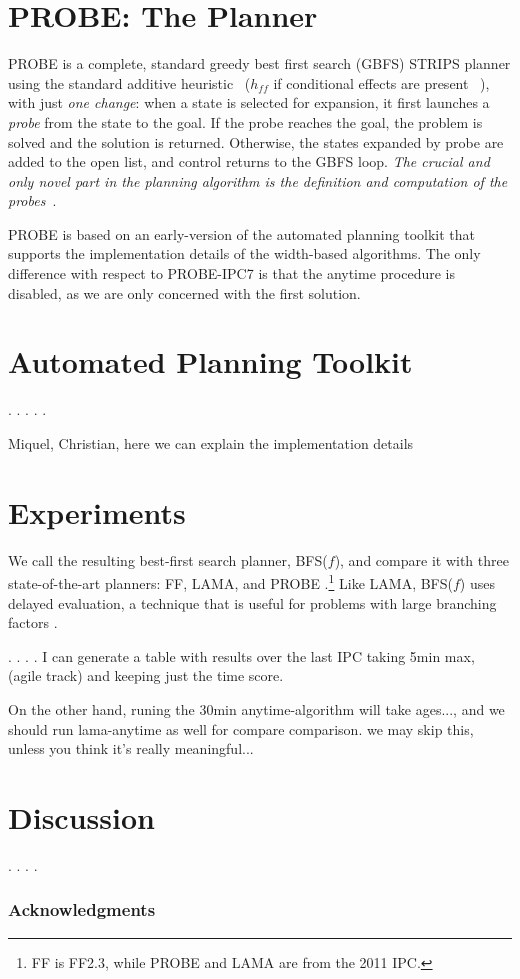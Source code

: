 \documentclass[letterpaper]{article}
\begin{document}
\section{PROBE: The Planner}

PROBE is a complete, standard greedy best first search (GBFS) STRIPS
planner using the standard {additive heuristic}~\cite{bonet:aij-hsp}
($h_{ff}$ if conditional effects are present ~\cite{hoffmann:ff}),
with just \emph{one change}: when a state is selected for expansion,
it first launches a \emph{probe} from the state to the goal. If the
probe reaches the goal, the problem is solved and the solution is
returned. Otherwise, the states expanded by probe are added to the
open list, and control returns to the GBFS loop.  \emph{The crucial
  and only novel part in the planning algorithm is the definition and
  computation of the probes}~\cite{nir:icaps11}.

PROBE is based on an early-version of the automated planning toolkit
that supports the implementation details of the width-based
algorithms. The only difference with respect to PROBE-IPC7 is that the
anytime procedure is disabled, as we are only concerned with the first
solution.

\section{Automated Planning Toolkit}
.
.
.
.
.

Miquel, Christian, here we can explain the implementation details


\section{Experiments}

We call the resulting best-first search planner, BFS($f$), and compare
it with three state-of-the-art planners: FF, LAMA, and PROBE
\cite{hoffmann:ff,richter:lama,nir:icaps11}.\footnote{FF is FF2.3,
  while PROBE and LAMA are from the 2011 IPC.}  Like LAMA, BFS($f$)
uses delayed evaluation, a technique that is useful for problems with
large branching factors \cite{richter:preferred-ops-and-deferred}.

.  .  .  .  I can generate a table with results over the last IPC
taking 5min max, (agile track) and keeping just the time score.

On the other hand, runing the 30min anytime-algorithm will take ages..., and
we should run lama-anytime as well for compare comparison. we may skip this,
unless you think it's really meaningful...

\section{Discussion}
.
.
.
.

\subsubsection{Acknowledgments}




\end{document}
